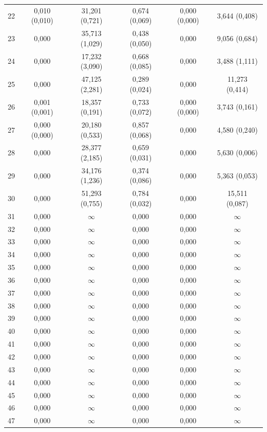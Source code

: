 \begin{tabular}{l c c c c c}
22 & 0,010 (0,010) & 31,201 (0,721) & 0,674 (0,069) & 0,000 (0,000) & 3,644 (0,408) \\
23 & 0,000 & 35,713 (1,029) & 0,438 (0,050) & 0,000 & 9,056 (0,684) \\
24 & 0,000 & 17,232 (3,090) & 0,668 (0,085) & 0,000 & 3,488 (1,111) \\
25 & 0,000 & 47,125 (2,281) & 0,289 (0,024) & 0,000 & 11,273 (0,414) \\
26 & 0,001 (0,001) & 18,357 (0,191) & 0,733 (0,072) & 0,000 (0,000) & 3,743 (0,161) \\
27 & 0,000 (0,000) & 20,180 (0,533) & 0,857 (0,068) & 0,000 & 4,580 (0,240) \\
28 & 0,000 & 28,377 (2,185) & 0,659 (0,031) & 0,000 & 5,630 (0,006) \\
29 & 0,000 & 34,176 (1,236) & 0,374 (0,086) & 0,000 & 5,363 (0,053) \\
30 & 0,000 & 51,293 (0,755) & 0,784 (0,032) & 0,000 & 15,511 (0,087) \\
31 & 0,000 & $\infty$ & 0,000 & 0,000 & $\infty$ \\
32 & 0,000 & $\infty$ & 0,000 & 0,000 & $\infty$ \\
33 & 0,000 & $\infty$ & 0,000 & 0,000 & $\infty$ \\
34 & 0,000 & $\infty$ & 0,000 & 0,000 & $\infty$ \\
35 & 0,000 & $\infty$ & 0,000 & 0,000 & $\infty$ \\
36 & 0,000 & $\infty$ & 0,000 & 0,000 & $\infty$ \\
37 & 0,000 & $\infty$ & 0,000 & 0,000 & $\infty$ \\
38 & 0,000 & $\infty$ & 0,000 & 0,000 & $\infty$ \\
39 & 0,000 & $\infty$ & 0,000 & 0,000 & $\infty$ \\
40 & 0,000 & $\infty$ & 0,000 & 0,000 & $\infty$ \\
41 & 0,000 & $\infty$ & 0,000 & 0,000 & $\infty$ \\
42 & 0,000 & $\infty$ & 0,000 & 0,000 & $\infty$ \\
43 & 0,000 & $\infty$ & 0,000 & 0,000 & $\infty$ \\
44 & 0,000 & $\infty$ & 0,000 & 0,000 & $\infty$ \\
45 & 0,000 & $\infty$ & 0,000 & 0,000 & $\infty$ \\
46 & 0,000 & $\infty$ & 0,000 & 0,000 & $\infty$ \\
47 & 0,000 & $\infty$ & 0,000 & 0,000 & $\infty$ \\

\end{tabular}
